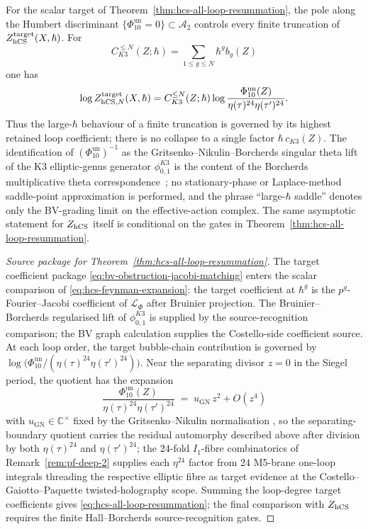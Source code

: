 \begin{proposition}
\label{prop:hcs-large-hbar-limit}
For the scalar target of Theorem~\ref{thm:hcs-all-loop-resummation},
the pole along the Humbert discriminant
$\{\Phi_{10}^{\mathrm{un}}=0\}\subset\mathcal{A}_{2}$
controls every finite truncation of
$Z_{\mathrm{hCS}}^{\mathrm{target}}(X,\hbar)$. For
\[
C_{K3}^{\leq N}(Z;\hbar)=\sum_{1\leq g\leq N}\hbar^g b_g(Z)
\]
one has
\[
\log Z_{\mathrm{hCS},N}^{\mathrm{target}}(X,\hbar)
=
C_{K3}^{\leq N}(Z;\hbar)
\log\frac{\Phi_{10}^{\mathrm{un}}(Z)}
{\eta(\tau)^{24}\eta(\tau')^{24}}.
\]
Thus the large-\(\hbar\) behaviour of a finite truncation is governed
by its highest retained loop coefficient; there is no collapse to a
single factor \(\hbar\,c_{K3}(Z)\). The
identification of $(\Phi_{10}^{\mathrm{un}})^{-1}$ as the Gritsenko--Nikulin--Borcherds
singular theta lift of the K3 elliptic-genus generator
$\phi_{0,1}^{K3}$ is the content of the Borcherds multiplicative theta
correspondence~\cite{GritsenkoNikulin1998}; no stationary-phase or
Laplace-method saddle-point approximation is performed, and the
phrase ``large-$\hbar$ saddle'' denotes only the BV-grading limit on
the effective-action complex.  The same asymptotic statement for
$Z_{\mathrm{hCS}}$ itself is conditional on the gates in
Theorem~\ref{thm:hcs-all-loop-resummation}.
\end{proposition}

\begin{proof}[Source package for Theorem~\ref{thm:hcs-all-loop-resummation}]
The target coefficient package \eqref{eq:bv-obstruction-jacobi-matching}
enters the scalar comparison of \eqref{eq:hcs-feynman-expansion}: the
target coefficient at $\hbar^{g}$ is the \(p^g\)-Fourier--Jacobi
coefficient of \(\mathcal L_{\Phi}\) after Bruinier projection. The
Bruinier--Borcherds regularised lift of \(\phi_{0,1}^{K3}\) is supplied by
the source-recognition comparison; the BV graph calculation supplies the
Costello-side coefficient source.  At each loop order, the target
bubble-chain contribution is governed by
\(\log\bigl(\Phi_{10}^{\mathrm{un}}/(\eta(\tau)^{24}\eta(\tau')^{24})\bigr)\).
Near the separating divisor \(z=0\) in the Siegel period, the quotient has
the expansion
\[
 \frac{\Phi_{10}^{\mathrm{un}}(Z)}
 {\eta(\tau)^{24}\eta(\tau')^{24}}
 \;=\;
 u_{\mathrm{GN}}\,z^{2}+O(z^{4})
\]
with \(u_{\mathrm{GN}}\in\mathbb C^\times\) fixed by the
Gritsenko--Nikulin normalisation
\cite{GritsenkoNikulin1998,DijkgraafVerlindeVerlinde1997},
so the separating-boundary quotient carries the residual automorphy
described above after division by both
$\eta(\tau)^{24}$ and $\eta(\tau')^{24}$; the
$24$-fold $I_{1}$-fibre combinatorics of
Remark~\ref{rem:pf-deep-2} supplies each $\eta^{24}$ factor from
$24$ M5-brane one-loop integrals threading the respective elliptic
fibre as target evidence at the Costello--Gaiotto--Paquette
twisted-holography scope.  Summing the loop-degree target coefficients
gives \eqref{eq:hcs-all-loop-resummation}; the final comparison with
$Z_{\mathrm{hCS}}$ requires the finite Hall--Borcherds source-recognition gates.
\end{proof}

